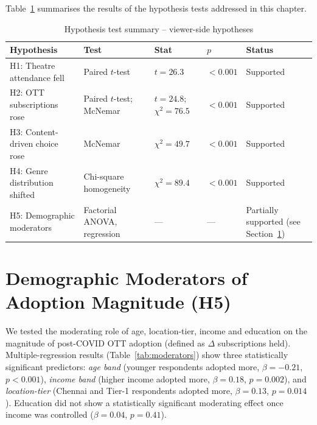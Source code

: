 Table~\ref{tab:hyp_5} summarises the results of the hypothesis tests
addressed in this chapter.

\begin{table}[h]
\centering
\caption{Hypothesis test summary -- viewer-side hypotheses}
\label{tab:hyp_5}
\small
\begin{tabular}{p{4.0cm} p{4.0cm} p{2.0cm} p{2.5cm} p{1.5cm}}
\toprule
\textbf{Hypothesis} & \textbf{Test} & \textbf{Stat} & \textbf{$p$} & \textbf{Status}\\
\midrule
H1: Theatre attendance fell      & Paired $t$-test & $t = 26.3$ & $<0.001$ & Supported \\
H2: OTT subscriptions rose       & Paired $t$-test; McNemar & $t = 24.8$; $\chi^2 = 76.5$ & $<0.001$ & Supported \\
H3: Content-driven choice rose   & McNemar & $\chi^2 = 49.7$ & $<0.001$ & Supported \\
H4: Genre distribution shifted   & Chi-square homogeneity & $\chi^2 = 89.4$ & $<0.001$ & Supported \\
H5: Demographic moderators       & Factorial ANOVA, regression & --- & --- & Partially supported (see Section~\ref{sec:moderators}) \\
\bottomrule
\end{tabular}
\end{table}

\section{Demographic Moderators of Adoption Magnitude (H5)}
\label{sec:moderators}

We tested the moderating role of age, location-tier, income and
education on the magnitude of post-COVID OTT adoption (defined as
$\Delta$ subscriptions held).  Multiple-regression results
(Table~\ref{tab:moderators}) show three statistically significant
predictors: \emph{age band} (younger respondents adopted more,
$\beta = -0.21$, $p < 0.001$), \emph{income band} (higher income
adopted more, $\beta = 0.18$, $p = 0.002$), and \emph{location-tier}
(Chennai and Tier-1 respondents adopted more,
$\beta = 0.13$, $p = 0.014$).  Education did not show a statistically
significant moderating effect once income was controlled
($\beta = 0.04$, $p = 0.41$).

